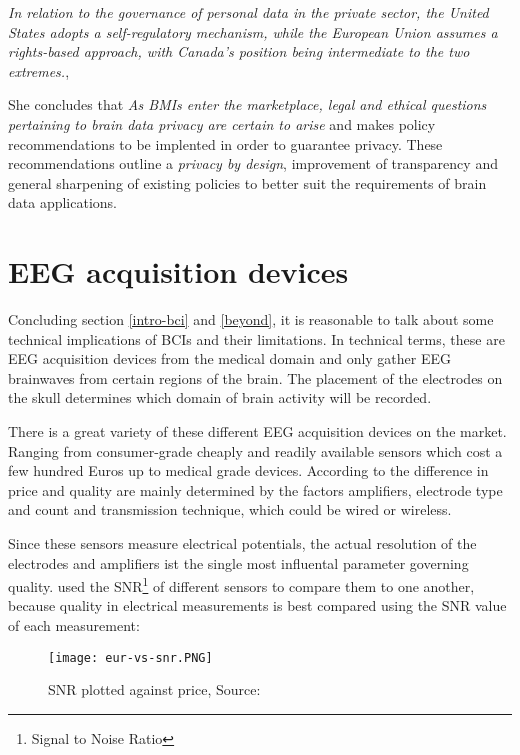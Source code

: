                 \medskip
                \emph{In relation to the governance of personal data in the private sector, the United States adopts a self-regulatory mechanism, while the European Union assumes a rights-based approach, with Canada's position being intermediate to the two extremes.}, \cite{Greenberg.2019}
                \medskip

                She concludes that \emph{As BMIs enter the marketplace, legal and ethical questions pertaining to brain data privacy are certain to arise}\cite[43]{Greenberg.2019} and makes policy recommendations to be implented in order to guarantee privacy. These recommendations outline a \textit{privacy by design}, improvement of transparency and general sharpening of existing policies to better suit the requirements of brain data applications.

        \section{EEG acquisition devices}

            Concluding section \ref*{intro-bci} and \ref*{beyond}, it is reasonable to talk about some technical implications of BCIs and their limitations. In technical terms, these are EEG acquisition devices from the medical domain and only gather EEG brainwaves from certain regions of the brain. The placement of the electrodes on the skull determines which domain of brain activity will be recorded. 

            There is a great variety of these different EEG acquisition devices on the market. Ranging from consumer-grade cheaply and readily available sensors which cost a few hundred Euros up to medical grade devices. According to \cite{Zerafa.2018} the difference in price and quality are mainly determined by the factors amplifiers, electrode type and count and transmission technique, which could be wired or wireless.

            Since these sensors measure electrical potentials, the actual resolution of the electrodes and amplifiers ist the single most influental parameter governing quality. \cite{Zerafa.2018} used the SNR\footnote{Signal to Noise Ratio} of different sensors to compare them to one another, because quality in electrical measurements is best compared using the SNR value of each measurement:

            \begin{figure}[h]     %
                \centering
                \texttt{[image: eur-vs-snr.PNG]} 
                \caption{SNR plotted against price, Source: \cite{Zerafa.2018}}\label{snr-eur}
            \end{figure}              
                
